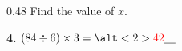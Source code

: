\documentclass[aspectratio=169]{beamer}
\newcommand{\ablank}[1]{%
  \alt<2>{\textcolor{red}{#1}}{\underline{\phantom{#1}}}%
}
\newcommand{\ashow}[1]{\uncover<2->{\textcolor{red}{\small #1}}}
\begin{document}
\begin{frame}
\begin{columns}[t,onlytextwidth]
\begin{column}{0.48\textwidth}
      \vspace{0.7em}
      Find the value of $x$.
      \ashow{\quad $x = 62^\circ$}

      \vfill
        \vspace{1em}
      \textbf{4.} \quad $(84 \div 6) \times 3 = \ablank{42}$
    \end{column}
  \end{columns}

\end{frame}

\end{document}
